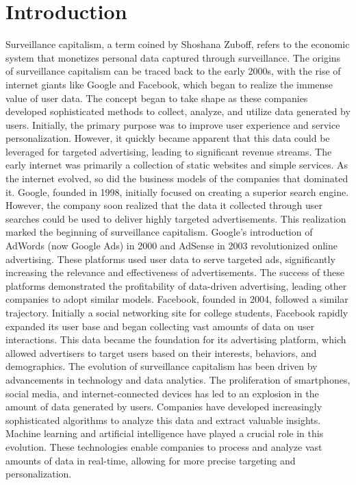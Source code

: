\section{Introduction}\label{sec:introduction}
Surveillance capitalism, a term coined by Shoshana Zuboff, refers to the economic system that monetizes personal data captured through surveillance.
The origins of surveillance capitalism can be traced back to the early 2000s, with the rise of internet giants like Google and Facebook, which began to realize the immense value of user data.
The concept began to take shape as these companies developed sophisticated methods to collect, analyze, and utilize data generated by users.
Initially, the primary purpose was to improve user experience and service personalization.
However, it quickly became apparent that this data could be leveraged for targeted advertising, leading to significant revenue streams.
The early internet was primarily a collection of static websites and simple services.
As the internet evolved, so did the business models of the companies that dominated it.
Google, founded in 1998, initially focused on creating a superior search engine.
However, the company soon realized that the data it collected through user searches could be used to deliver highly targeted advertisements.
This realization marked the beginning of surveillance capitalism.
Google's introduction of AdWords (now Google Ads) in 2000 and AdSense in 2003 revolutionized online advertising.
These platforms used user data to serve targeted ads, significantly increasing the relevance and effectiveness of advertisements.
The success of these platforms demonstrated the profitability of data-driven advertising, leading other companies to adopt similar models.
Facebook, founded in 2004, followed a similar trajectory.
Initially a social networking site for college students, Facebook rapidly expanded its user base and began collecting vast amounts of data on user interactions.
This data became the foundation for its advertising platform, which allowed advertisers to target users based on their interests, behaviors, and demographics.
The evolution of surveillance capitalism has been driven by advancements in technology and data analytics.
The proliferation of smartphones, social media, and internet-connected devices has led to an explosion in the amount of data generated by users.
Companies have developed increasingly sophisticated algorithms to analyze this data and extract valuable insights.
Machine learning and artificial intelligence have played a crucial role in this evolution.
These technologies enable companies to process and analyze vast amounts of data in real-time, allowing for more precise targeting and personalization.
